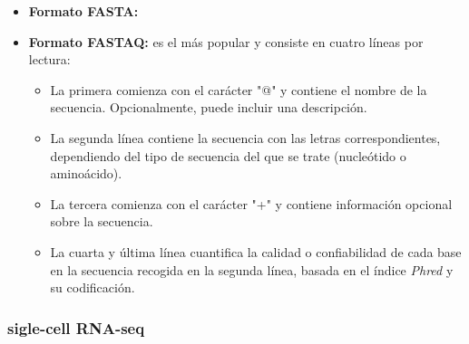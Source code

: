 \begin{itemize}
    \item \textbf{Formato FASTA:}
    \item \textbf{Formato FASTAQ:} es el más popular y consiste en cuatro líneas por lectura:
    \begin{itemize}
        \item La primera comienza con el carácter "@" y contiene el nombre de la secuencia. Opcionalmente, puede incluir una descripción.
        \item La segunda línea contiene la secuencia con las letras correspondientes, dependiendo del tipo de secuencia del que se trate (nucleótido o aminoácido).
        \item La tercera comienza con el carácter "+" y contiene información opcional sobre la secuencia.
        \item La cuarta y última línea cuantifica la calidad o confiabilidad de cada base en la secuencia recogida en la segunda línea, basada en el índice
        \textit{Phred} y su codificación.
    \end{itemize}
\end{itemize}

\subsubsection{sigle-cell RNA-seq}